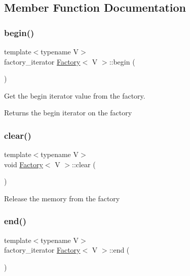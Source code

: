 \subsection{Member Function Documentation}
\mbox{\label{classFactory_a3ea08050cb96078e9d9624de4220d517}} 
\subsubsection{\texorpdfstring{begin()}{begin()}}
{\footnotesize\ttfamily template$<$typename V$>$ \\
factory\+\_\+iterator \mbox{\hyperlink{classFactory}{Factory}}$<$ V $>$\+::begin (\begin{DoxyParamCaption}{ }\end{DoxyParamCaption})\hspace{0.3cm}{\ttfamily [inline]}}

Get the begin iterator value from the factory.

\begin{DoxyReturn}{Returns}
the begin iterator on the factory 
\end{DoxyReturn}
\mbox{\label{classFactory_ab807366d94004ad2b1c88d5c95de1942}} 
\subsubsection{\texorpdfstring{clear()}{clear()}}
{\footnotesize\ttfamily template$<$typename V$>$ \\
void \mbox{\hyperlink{classFactory}{Factory}}$<$ V $>$\+::clear (\begin{DoxyParamCaption}{ }\end{DoxyParamCaption})\hspace{0.3cm}{\ttfamily [inline]}}

Release the memory from the factory \mbox{\label{classFactory_a8b583450f222b426ba2212365f49638f}} 
\subsubsection{\texorpdfstring{end()}{end()}}
{\footnotesize\ttfamily template$<$typename V$>$ \\
factory\+\_\+iterator \mbox{\hyperlink{classFactory}{Factory}}$<$ V $>$\+::end (\begin{DoxyParamCaption}{ }\end{DoxyParamCaption})\hspace{0.3cm}{\ttfamily [inline]}}

